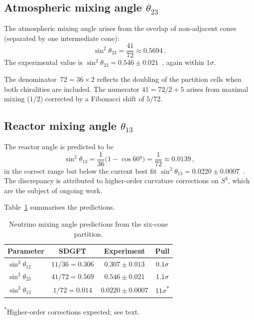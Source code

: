 \documentclass[amsmath,amssymb,aps,prd,twocolumn,superscriptaddress,nofootinbib]{revtex4-2}
\begin{document}
\subsection{Atmospheric mixing angle $\theta_{23}$}

The atmospheric mixing angle arises from the overlap of non-adjacent cones
(separated by one intermediate cone):
\begin{equation}\label{eq:sin23}
  \sin^2\theta_{23} = \frac{41}{72} \approx 0.5694\,.
\end{equation}
The experimental value is $\sin^2\theta_{23} = 0.546 \pm 0.021$~\cite{Esteban2020},
again within $1\sigma$.

The denominator~$72 = 36 \times 2$ reflects the doubling of the partition
cells when both chiralities are included.  The numerator $41 = 72/2 + 5$ arises
from maximal mixing ($1/2$) corrected by a Fibonacci shift of $5/72$.

\subsection{Reactor mixing angle $\theta_{13}$}

The reactor angle is predicted to be
\begin{equation}\label{eq:sin13}
  \sin^2\theta_{13} = \frac{1}{36}\bigl(1 - \cos 60°\bigr)
  = \frac{1}{72} \approx 0.0139\,,
\end{equation}
in the correct range but below the current best fit $\sin^2\theta_{13} =
0.0220 \pm 0.0007$~\cite{Esteban2020}.  The discrepancy is attributed to
higher-order curvature corrections on $S^3$, which are the subject of ongoing
work.

Table~\ref{tab:mixing} summarises the predictions.

\begin{table}[H]
\centering
\caption{Neutrino mixing angle predictions from the six-cone
         partition.}\label{tab:mixing}
\begin{tabular}{@{}lccc@{}}
\toprule
Parameter & SDGFT & Experiment & Pull \\
\midrule
$\sin^2\theta_{12}$ & $11/36 = 0.306$ & $0.307 \pm 0.013$ & $0.1\sigma$ \\
$\sin^2\theta_{23}$ & $41/72 = 0.569$ & $0.546 \pm 0.021$ & $1.1\sigma$ \\
$\sin^2\theta_{13}$ & $1/72 = 0.014$  & $0.0220 \pm 0.0007$ & $11\sigma$\textsuperscript{*} \\
\bottomrule
\end{tabular}

\smallskip
\textsuperscript{*}{\footnotesize Higher-order corrections expected; see text.}
\end{table}
\end{document}
